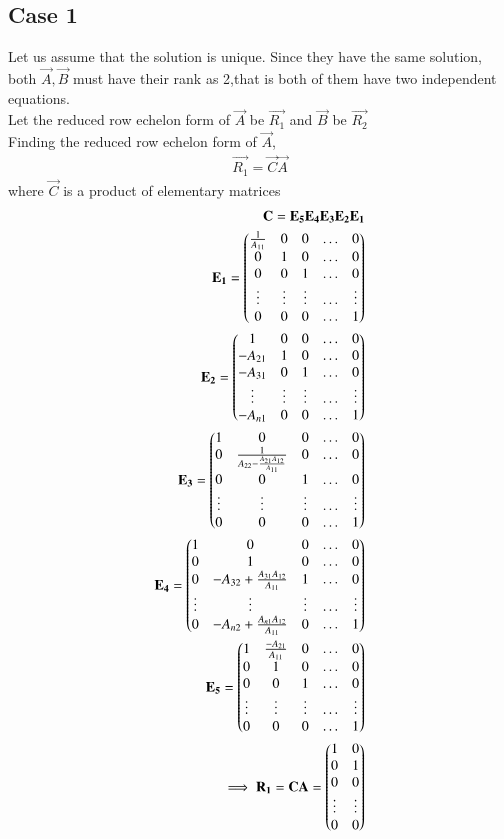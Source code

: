 \documentclass[journal,12pt,twocolumn]{IEEEtran}
\begin{document}
\subsection{Case 1}
Let us assume that the solution is unique.
Since they have the same solution, both $\vec{A},\vec{B}$ must have their rank as 2,that is both of them have two independent equations.\\
Let the reduced row echelon form of $\vec{A}$ be $\vec{R_1}$ and $\vec{B}$ be $\vec{R_2}$\\
Finding the reduced row echelon form of $\vec{A}$,
\begin{align}
    \vec{R_1}=\vec{C}\vec{A}
\end{align}
where $\vec{C}$ is a product of elementary matrices
\begin{align}
    \mathbf{C}=\mathbf{E_5}\mathbf{E_4}\mathbf{E_3}\mathbf{E_2}\mathbf{E_1}\\
    \mathbf{E_1}=\begin{pmatrix}\frac{1}{A_{11}}&0&0&\hdots&0\\0&1&0&\hdots&0\\0&0&1&\hdots&0\\\vdots&\vdots&\vdots&\hdots&\vdots\\0&0&0&\hdots&1\end{pmatrix}\\
   \mathbf{E_2}=\begin{pmatrix}1&0&0&\hdots&0\\-A_{21}&1&0&\hdots&0\\-A_{31}&0&1&\hdots&0\\\vdots&\vdots&\vdots&\hdots&\vdots\\-A_{n1}&0&0&\hdots&1\end{pmatrix}\\
   \mathbf{E_3}=\begin{pmatrix}1&0&0&\hdots&0\\0&\frac{1}{A_{22}-\frac{A_{21}A_{12}}{A_{11}}}&0&\hdots&0\\0&0&1&\hdots&0\\\vdots&\vdots&\vdots&\hdots&\vdots\\0&0&0&\hdots&1\end{pmatrix}\\
   \mathbf{E_4}=\begin{pmatrix}1&0&0&\hdots&0\\0&1&0&\hdots&0\\0&-A_{32}+\frac{A_{31}A_{12}}{A_{11}}&1&\hdots&0\\\vdots&\vdots&\vdots&\hdots&\vdots\\0&-A_{n2}+\frac{A_{n1}A_{12}}{A_{11}}&0&\hdots&1\end{pmatrix}\\
   \mathbf{E_5}=\begin{pmatrix}1&\frac{-A_{21}}{A_{11}}&0&\hdots&0\\0&1&0&\hdots&0\\0&0&1&\hdots&0\\\vdots&\vdots&\vdots&\hdots&\vdots\\0&0&0&\hdots&1\end{pmatrix}\\
   \implies \mathbf{R_1}=\mathbf{C}\mathbf{A}=\begin{pmatrix}1&0\\0&1\\0&0\\\vdots&\vdots\\0&0\end{pmatrix}
\end{align}
\end{document}

